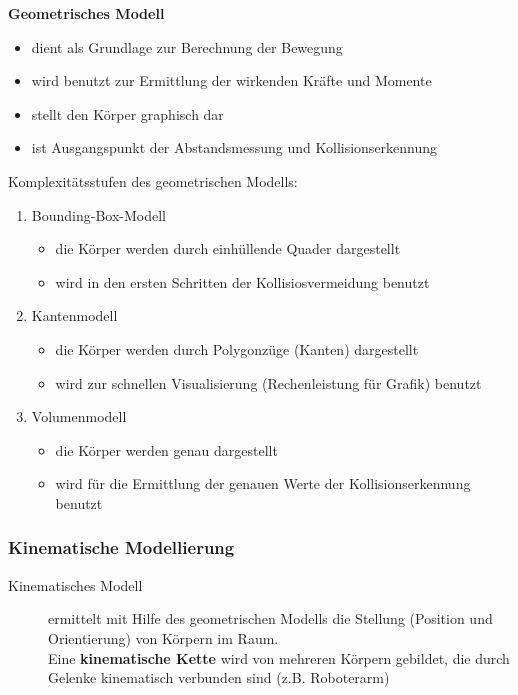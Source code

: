 \textbf{Geometrisches Modell}
\begin{itemize}
\item dient als Grundlage zur Berechnung der Bewegung
\item wird benutzt zur Ermittlung der wirkenden Kräfte und Momente
\item stellt den Körper graphisch dar
\item ist Ausgangspunkt der Abstandsmessung und Kollisionserkennung
\end{itemize}
Komplexitätsstufen des geometrischen Modells:
\begin{enumerate}
\item Bounding-Box-Modell
\begin{itemize}
\item die Körper werden durch einhüllende Quader dargestellt
\item wird in den ersten Schritten der Kollisiosvermeidung benutzt
\end{itemize}
\item Kantenmodell
\begin{itemize}
\item die Körper werden durch Polygonzüge (Kanten) dargestellt
\item wird zur schnellen Visualisierung (Rechenleistung für Grafik) benutzt
\end{itemize}
\item Volumenmodell
\begin{itemize}
\item die Körper werden genau dargestellt
\item wird für die Ermittlung der genauen Werte der Kollisionserkennung benutzt
\end{itemize}
\end{enumerate}

\subsubsection*{Kinematische Modellierung}

\begin{description}
\item[Kinematisches Modell] ermittelt mit Hilfe des geometrischen Modells die Stellung (Position und Orientierung) von Körpern im Raum. \\ Eine \textbf{kinematische Kette} wird von mehreren Körpern gebildet, die durch Gelenke kinematisch verbunden sind (z.B. Roboterarm)
\end{description}

